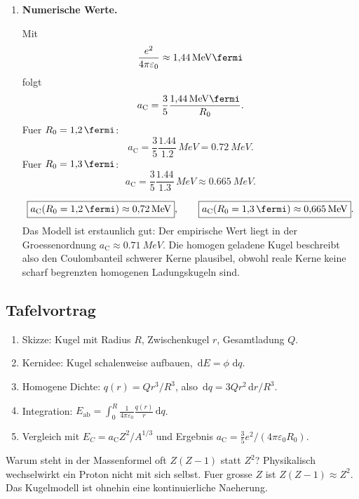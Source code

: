 \documentclass[11pt,a4paper]{scrartcl}
\newcommand{\dd}{\,\mathrm{d}}
\newcommand{\MeV}{\si{MeV}}
\theoremstyle{definition}
\theoremstyle{plain}
\theoremstyle{remark}
\newcommand{\Eab}{E_{\mathrm{ab}}}
\newcommand{\aC}{a_{\mathrm C}}
\begin{document}
\begin{enumerate}[label=(\alph*)]
    \item \textbf{Numerische Werte.}

    \begin{calculationbox}
    Mit
    \[
        \frac{e^2}{4\pi\varepsilon_0}\approx \SI{1.44}{\MeV\fermi}
    \]
    folgt
    \[
        \aC=\frac{3}{5}\frac{\SI{1.44}{\MeV\fermi}}{R_0}.
    \]
    Fuer $R_0=\SI{1.2}{\fermi}$:
    \[
        \aC=\frac{3}{5}\frac{1.44}{1.2}\,\si{\MeV}=\SI{0.72}{\MeV}.
    \]
    Fuer $R_0=\SI{1.3}{\fermi}$:
    \[
        \aC=\frac{3}{5}\frac{1.44}{1.3}\,\si{\MeV}\approx\SI{0.665}{\MeV}.
    \]
    \end{calculationbox}

    \begin{answerbox}
    \[
        \boxed{\aC(R_0=\SI{1.2}{\fermi})\approx\SI{0.72}{\MeV}},\qquad
        \boxed{\aC(R_0=\SI{1.3}{\fermi})\approx\SI{0.665}{\MeV}}.
    \]
    Das Modell ist erstaunlich gut: Der empirische Wert liegt in der Groessenordnung $\aC\approx\SI{0.71}{\MeV}$. Die homogen geladene Kugel beschreibt also den Coulombanteil schwerer Kerne plausibel, obwohl reale Kerne keine scharf begrenzten homogenen Ladungskugeln sind.
    \end{answerbox}
\end{enumerate}

\subsection{Tafelvortrag}
\begin{summarybox}[title=5-Minuten-Struktur]
\begin{enumerate}
    \item Skizze: Kugel mit Radius $R$, Zwischenkugel $r$, Gesamtladung $Q$.
    \item Kernidee: Kugel schalenweise aufbauen, $\dd E=\phi\,\dd q$.
    \item Homogene Dichte: $q(r)=Q r^3/R^3$, also $\dd q=3Qr^2\dd r/R^3$.
    \item Integration: $\Eab=\int_0^R \frac{1}{4\pi\varepsilon_0}\frac{q(r)}{r}\dd q$.
    \item Vergleich mit $E_C=\aC Z^2/A^{1/3}$ und Ergebnis $\aC=\frac{3}{5}e^2/(4\pi\varepsilon_0R_0)$.
\end{enumerate}
\end{summarybox}

\begin{notebox}[title=Typische Rueckfrage]
Warum steht in der Massenformel oft $Z(Z-1)$ statt $Z^2$? Physikalisch wechselwirkt ein Proton nicht mit sich selbst. Fuer grosse $Z$ ist $Z(Z-1)\approx Z^2$. Das Kugelmodell ist ohnehin eine kontinuierliche Naeherung.
\end{notebox}
\end{document}
